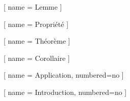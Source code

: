 \usepackage{amsthm}
\usepackage{keytheorems}
\usepackage{hyperref} 

[
	name = Lemme
]

[
	name = Propriété
]

[
	name = Théorème
]

[
	name = Corollaire
]

[
	name = Application,
	numbered=no
]

[
	name = Introduction,
	numbered=no
]

\renewcommand*{\proofname}{Démonstration}

\theoremstyle{definition}
\newtheorem{defn}{Définition}

\theoremstyle{definition}
\newtheorem*{nota}{Notation}

\theoremstyle{definition}
\newtheorem*{limi}{Liminaire}

\theoremstyle{remark}
\newtheorem{rmq}{Remarque}

\theoremstyle{plain}
\newtheorem*{fait}{Fait}
